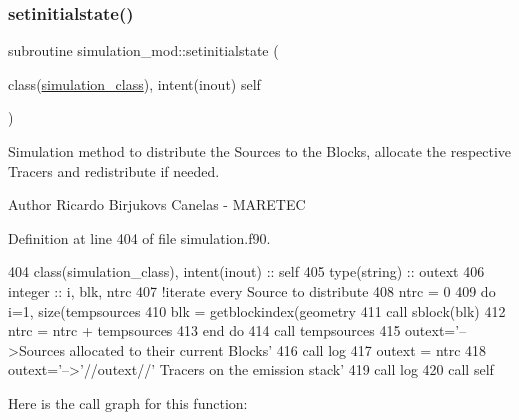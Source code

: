 \subsubsection{\texorpdfstring{setinitialstate()}{setinitialstate()}}
{\footnotesize\ttfamily subroutine simulation\+\_\+mod\+::setinitialstate (\begin{DoxyParamCaption}\item[{class(\mbox{\hyperlink{structsimulation__mod_1_1simulation__class}{simulation\+\_\+class}}), intent(inout)}]{self }\end{DoxyParamCaption})\hspace{0.3cm}{\ttfamily [private]}}



Simulation method to distribute the Sources to the Blocks, allocate the respective Tracers and redistribute if needed. 

\begin{DoxyAuthor}{Author}
Ricardo Birjukovs Canelas -\/ M\+A\+R\+E\+T\+EC 
\end{DoxyAuthor}


Definition at line 404 of file simulation.\+f90.


\begin{DoxyCode}
404     \textcolor{keywordtype}{class}(simulation\_class), \textcolor{keywordtype}{intent(inout)} :: self
405     \textcolor{keywordtype}{type}(string) :: outext
406     \textcolor{keywordtype}{integer} :: i, blk, ntrc
407     \textcolor{comment}{!iterate every Source to distribute}
408     ntrc = 0
409     \textcolor{keywordflow}{do} i=1, \textcolor{keyword}{size}(tempsources%
410         blk = getblockindex(geometry%
411         \textcolor{keyword}{call }sblock(blk)%
412         ntrc = ntrc + tempsources%
413 \textcolor{keywordflow}{    end do}
414     \textcolor{keyword}{call }tempsources%
415     outext=\textcolor{stringliteral}{'-->Sources allocated to their current Blocks'}
416     \textcolor{keyword}{call }log%
417     outext = ntrc
418     outext=\textcolor{stringliteral}{'-->'}//outext//\textcolor{stringliteral}{' Tracers on the emission stack'}
419     \textcolor{keyword}{call }log%
420     \textcolor{keyword}{call }self%
\end{DoxyCode}
Here is the call graph for this function\+:
\mbox{\label{namespacesimulation__mod_acc5fa823c8dd599de8feda8988c224f2}} 
